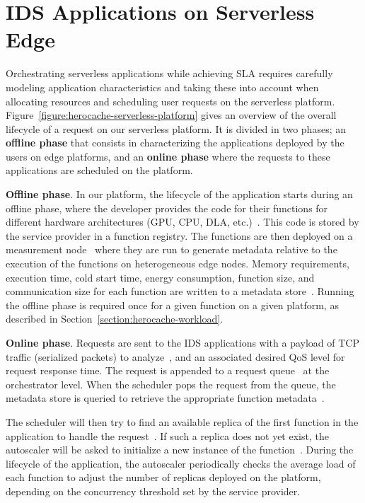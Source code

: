 \section{IDS Applications on Serverless Edge}
\label{section:herocache-before-contrib}

Orchestrating serverless applications while achieving SLA requires carefully modeling application characteristics and taking these into account when allocating resources and scheduling user requests on the serverless platform. Figure~\ref{figure:herocache-serverless-platform} gives an overview of the overall lifecycle of a request on our serverless platform. It is divided in two phases; an \textbf{offline phase} that consists in characterizing the applications deployed by the users on edge platforms, and an \textbf{online phase} where the requests to these applications are scheduled on the platform.

\textbf{Offline phase}. In our platform, the lifecycle of the application starts during an offline phase, where the developer provides the code for their functions for different hardware architectures (GPU, CPU, DLA, etc.)~. This code is stored by the service provider in a function registry. The functions are then deployed on a measurement node~ where they are run to generate metadata relative to the execution of the functions on heterogeneous edge nodes. Memory requirements, execution time, cold start time, energy consumption, function size, and communication size for each function are written to a metadata store~. Running the offline phase is required once for a given function on a given platform, as described in Section~\ref{section:herocache-workload}.

\textbf{Online phase}. Requests are sent to the IDS applications with a payload of TCP traffic (serialized packets) to analyze~, and an associated desired QoS level for request response time. The request is appended to a request queue~ at the orchestrator level. When the scheduler pops the request from the queue, the metadata store is queried to retrieve the appropriate function metadata~.

The scheduler will then try to find an available replica of the first function in the application to handle the request~. If such a replica does not yet exist, the autoscaler will be asked to initialize a new instance of the function~. During the lifecycle of the application, the autoscaler periodically checks the average load of each function to adjust the number of replicas deployed on the platform, depending on the concurrency threshold set by the service provider.

